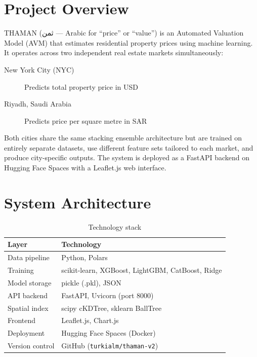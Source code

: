 \documentclass[11pt, a4paper, twoside]{report}
\newcommand{\textarabic}[1]{#1}
\begin{document}
\newpage\thispagestyle{empty}\mbox{}\newpage

\tableofcontents
\newpage

\chapter{Project Overview}
\label{ch:overview}

THAMAN (\textarabic{ثمن} --- Arabic for ``price'' or ``value'') is an
Automated Valuation Model (AVM) that estimates residential property prices using
machine learning. It operates across two independent real estate markets
simultaneously:
\begin{description}
  \item[New York City (NYC)] Predicts total property price in USD
  \item[Riyadh, Saudi Arabia] Predicts price per square metre in SAR
\end{description}

Both cities share the same stacking ensemble architecture but are trained on
entirely separate datasets, use different feature sets tailored to each market,
and produce city-specific outputs. The system is deployed as a FastAPI backend
on Hugging Face Spaces with a Leaflet.js web interface.

\chapter{System Architecture}
\label{ch:architecture}

\begin{table}[H]
  \centering
  \caption{Technology stack}
  \label{tab:tech_stack}
  \begin{tabular}{ll}
    \toprule
    Layer & Technology \\
    \midrule
    Data pipeline   & Python, Polars \\
    Training        & scikit-learn, XGBoost, LightGBM, CatBoost, Ridge \\
    Model storage   & pickle (.pkl), JSON \\
    API backend     & FastAPI, Uvicorn (port 8000) \\
    Spatial index   & scipy cKDTree, sklearn BallTree \\
    Frontend        & Leaflet.js, Chart.js \\
    Deployment      & Hugging Face Spaces (Docker) \\
    Version control & GitHub (\texttt{turkialm/thaman-v2}) \\
    \bottomrule
  \end{tabular}
\end{table}
\end{document}
